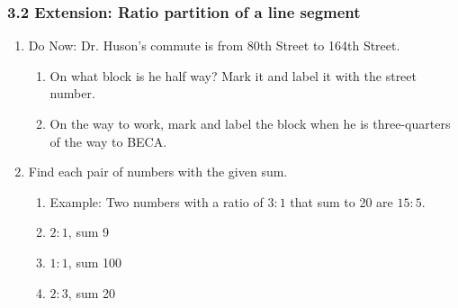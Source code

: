 

\fancyhead[LE]{\thepage}



\subsubsection*{3.2 Extension: Ratio partition of a line segment}
\begin{enumerate}
\item Do Now: Dr. Huson's commute is from 80th Street to 164th Street. 
    \begin{enumerate}
        \item On what block is he half way? Mark it and label it with the street number.
        \item On the way to work, mark and label the block when he is three-quarters of the way to BECA.
    \end{enumerate}
    \vspace{3cm}

\item Find each pair of numbers with the given sum.
\begin{enumerate}
    \item Example: Two numbers with a ratio of $3:1$ that sum to 20 are $15:5$.
    \item $2:1$, sum 9 \vspace{1cm}
    \item $1:1$, sum 100 \vspace{1cm}
    \item $2:3$, sum 20 \vspace{1cm}
\end{enumerate}


\end{enumerate}
